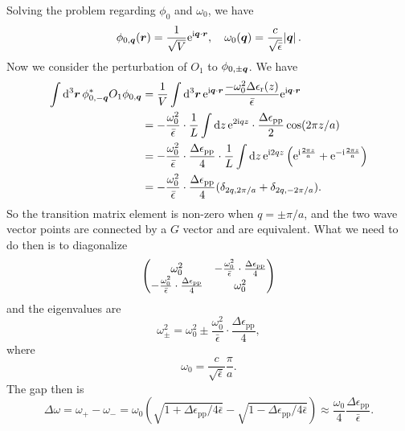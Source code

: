 \documentclass[hyperref, a4paper]{article}
\newcommand*{\ii}{\mathrm{i}}
\newcommand*{\ee}{\mathrm{e}}
\newcommand{\epsr}{\epsilon_{\text{r}}}
\begin{document}
Solving the problem regarding $\phi_0$ and $\omega_0$, we have 
\begin{equation}
    \phi_{0, \vb*{q}}(\vb*{r}) = \frac{1}{\sqrt{V}} \ee^{\ii \vb*{q} \cdot \vb*{r}}, \quad 
    \omega_0(\vb*{q}) = \frac{c}{\sqrt{\bar{\epsilon}}} \abs*{\vb*{q}}.
\end{equation}
Now we consider the perturbation of $O_1$ to $\phi_{0, \pm \vb*{q}}$. We have 
\begin{equation}
    \begin{aligned}
        \int \dd[3]{\vb*{r}} \phi_{0, - \vb*{q}}^* O_1 \phi_{0, \vb*{q}}
        &= \frac{1}{V} \int \dd[3]{\vb*{r}} \ee^{\ii \vb*{q} \cdot \vb*{r}} 
        \frac{- \omega_0^2 \Delta \epsr(z)}{\bar{\epsilon}} 
        \ee^{\ii \vb*{q} \cdot \vb*{r}} \\
        &= - \frac{\omega_0^2}{\bar{\epsilon}} \cdot 
        \frac{1}{L} \int \dd{z} \ee^{2 \ii q z} \cdot \frac{\Delta \epsilon_\text{pp}}{2} \cos(2 \pi z / a) \\
        &= - \frac{\omega_0^2}{\bar{\epsilon}} \cdot \frac{\Delta \epsilon_\text{pp}}{4}
        \cdot \frac{1}{L} \int \dd{z} \ee^{\ii 2 q z} \left(
            \ee^{\ii \frac{2 \pi z}{a}} + \ee^{- \ii \frac{2 \pi z}{a}}
        \right) \\
        &= - \frac{\omega_0^2}{\bar{\epsilon}} \cdot \frac{\Delta \epsilon_\text{pp}}{4}
        (\delta_{2q, 2\pi / a} + \delta_{2q, - 2\pi / a}).
    \end{aligned}
\end{equation}
So the transition matrix element is non-zero when $q = \pm \pi / a$,
and the two wave vector points are connected by a $G$ vector and are equivalent.
What we need to do then is to diagonalize 
\begin{equation}
    \pmqty{
        \omega_0^2 & - \frac{\omega_0^2}{\bar{\epsilon}} \cdot \frac{\Delta \epsilon_\text{pp}}{4} \\
        - \frac{\omega_0^2}{\bar{\epsilon}} \cdot \frac{\Delta \epsilon_\text{pp}}{4} & \omega_0^2 
    }
\end{equation}
and the eigenvalues are 
\begin{equation}
    \omega_\pm^2 = \omega_0^2 \pm \frac{\omega_0^2}{\bar{\epsilon}} \cdot \frac{\Delta \epsilon_\text{pp}}{4},
\end{equation}
where 
\begin{equation}
    \omega_0 = \frac{c}{\sqrt{\bar{\epsilon}}} \frac{\pi}{a}.
\end{equation}
The gap then is 
\begin{equation}
    \Delta \omega = \omega_+ - \omega_- 
    = \omega_0 (
        \sqrt{1 + \Delta \epsilon_{\text{pp}} / 4 \bar{\epsilon}} - 
        \sqrt{1 - \Delta \epsilon_{\text{pp}} / 4 \bar{\epsilon}}
    )
    \approx \frac{\omega_0}{4} \frac{\Delta \epsilon_{\text{pp}}}{\bar{\epsilon}}.
\end{equation}
\end{document}
